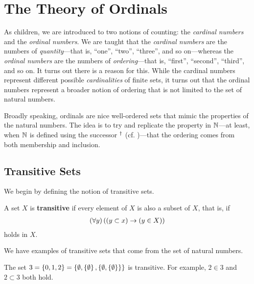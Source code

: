 \section{The Theory of Ordinals}

As children, we are introduced to two notions of counting: the \textit{cardinal numbers} and the \textit{ordinal numbers}. We are taught that the \textit{cardinal numbers} are the numbers of \textit{quantity}---that is, ``one'', ``two'', ``three'', and so on---whereas the \textit{ordinal numbers} are the numbers of \textit{ordering}---that is, ``first'', ``second'', ``third'', and so on. It turns out there is a reason for this. While the cardinal numbers represent different possible \textit{cardinalities} of finite sets, it turns out that the ordinal numbers represent a broader notion of ordering that is not limited to the set of natural numbers.

Broadly speaking, ordinals are nice well-ordered sets that mimic the properties of the natural numbers. The idea is to try and replicate the property in $\mathbb{N}$---at least, when $\mathbb{N}$ is defined using the successor $^{\dagger}$ (cf. )---that the ordering comes from both membership and inclusion.

\subsection{Transitive Sets}

We begin by defining the notion of transitive sets.

\begin{boxdefinition}[Transitivity]
    A set $X$ is \textbf{transitive} if every element of $X$ is also a subset of $X$, that is, if
    \begin{align*}
        \left( \forall y \right)\left( \left( y \subset x \right) \to \left( y \in X \right) \right)
    \end{align*}
    holds in $X$.
\end{boxdefinition}

We have examples of transitive sets that come from the set of natural numbers.

\begin{boxexample}\label{Ch3:Eg:3_trans}
    The set $3 = \left\{ 0, 1, 2 \right\} = \left\{ \emptyset, \left\{ \emptyset \right\}, \left\{ \emptyset, \left\{ \emptyset \right\} \right\} \right\}$ is transitive. For example, $2 \in 3$ and $2 \subset 3$ both hold.
\end{boxexample}


